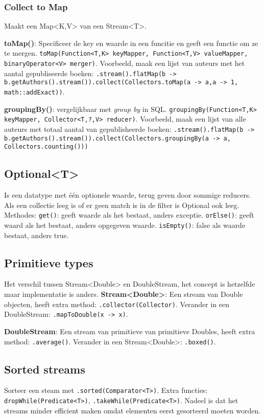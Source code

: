 \subsubsection{Collect to Map}
Maakt een Map<K,V> van een Stream<T>.

\textbf{toMap()}: 
Specificeer de key en waarde in een funcitie en geeft een functie om ze te mergen.
\texttt{toMap(Function<T,K> keyMapper, Function<T,V> valueMapper, binaryOperator<V> merger)}.
Voorbeeld, maak een lijst van auteurs met het aantal gepubliseerde boeken:
\texttt{.stream().flatMap(b -> b.getAuthors().stream()).collect(Collectors.toMap(a -> a,a -> 1, math::addExact))}.

\textbf{groupingBy()}: vergelijkbaar met \textit{group by} in SQL.
\texttt{groupingBy(Function<T,K> keyMapper, Collector<T,?,V> reducer)}.
Voorbeeld, maak een lijst van alle auteurs met totaal aantal van gepublisheerde boeken:
\texttt{.stream().flatMap(b -> b.getAuthors().stream()).collect(Collectors.groupingBy(a -> a, Collectors.counting()))}

\subsection{Optional<T>}
Is een datatype met \'e\'en optionele waarde, terug geven door sommige reducers.
Als een collectie leeg is of er geen match is in de filter is Optional ook leeg.
Methodes:
\texttt{get()}: geeft waarde als het bestaat, anders exceptie.
\texttt{orElse()}: geeft waard als het bestaat, anders opgegeven waarde.
\texttt{isEmpty()}: false als waarde bestaat, anders true.

\subsection{Primitieve types}
Het verschil tussen Stream<Double> en DoubleStream, het concept is hetzelfde maar implementatie is anders.
\textbf{Stream<Double>}:
Een stream van Double objecten, heeft extra method: \texttt{.collector(Collector)}.
Verander in een DoubleStream: \texttt{.mapToDouble(x -> x)}.

\textbf{DoubleStream}:
Een stream van primitieve van primitieve Doubles, heeft extra method: \texttt{.average()}.
Verander in een Stream<Double>: \texttt{.boxed()}.

\subsection{Sorted streams}
Sorteer een steam met \texttt{.sorted(Comparator<T>)}.
Extra functies: \texttt{dropWhile(Predicate<T>)}, \texttt{.takeWhile(Predicate<T>)}.
Nadeel is dat het streams minder efficient maken omdat elementen eerst gesorteerd moeten worden.

